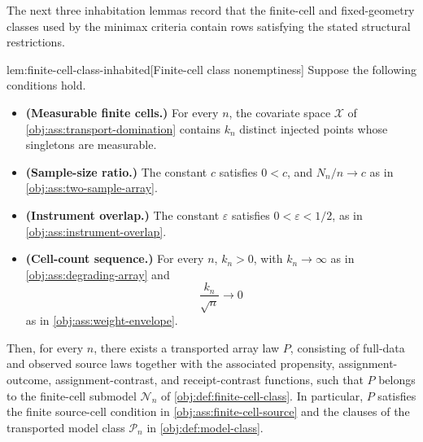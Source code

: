 \documentclass[11pt]{article}
\begin{document}
The next three inhabitation lemmas record that the finite-cell and fixed-geometry classes used by the minimax criteria contain rows satisfying the stated structural restrictions.

\begin{lemmav}{lem:finite-cell-class-inhabited}[Finite-cell class nonemptiness]
Suppose the following conditions hold.
\begin{itemize}
\item \textbf{(Measurable finite cells.)} For every \(n\), the covariate space \(\mathcal X\) of \cref{obj:ass:transport-domination} contains \(k_n\) distinct injected points whose singletons are measurable.
\item \textbf{(Sample-size ratio.)} The constant \(c\) satisfies \(0<c\), and \(N_n/n\to c\) as in \cref{obj:ass:two-sample-array}.
\item \textbf{(Instrument overlap.)} The constant \(\varepsilon\) satisfies \(0<\varepsilon<1/2\), as in \cref{obj:ass:instrument-overlap}.
\item \textbf{(Cell-count sequence.)} For every \(n\), \(k_n>0\), with \(k_n\to\infty\) as in \cref{obj:ass:degrading-array} and
\[
\frac{k_n}{\sqrt n}\to 0
\]
as in \cref{obj:ass:weight-envelope}.
\end{itemize}
Then, for every \(n\), there exists a transported array law \(P\), consisting of full-data and observed source laws together with the associated propensity, assignment-outcome, assignment-contrast, and receipt-contrast functions, such that \(P\) belongs to the finite-cell submodel \(\mathcal N_n\) of \cref{obj:def:finite-cell-class}. In particular, \(P\) satisfies the finite source-cell condition in \cref{obj:ass:finite-cell-source} and the clauses of the transported model class \(\mathcal P_n\) in \cref{obj:def:model-class}.
\end{lemmav}
\end{document}
